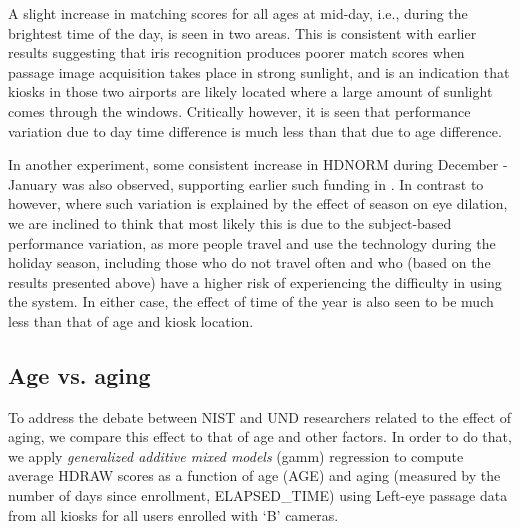 \documentclass{cta-author}%
\begin{document}
A  slight  increase in matching scores for all ages at mid-day, i.e., during the brightest time of the day, is seen in two areas. 
This is consistent with earlier results suggesting that iris recognition produces poorer match scores when passage image acquisition takes place in strong sunlight, 
and is an indication that kiosks in those two airports are likely located where a large amount of sunlight comes through the windows.
Critically however, it is seen that  performance variation due to day time difference is much less than that due to age difference.

In another experiment, some consistent increase in HDNORM during December - January was also observed,  supporting  earlier such funding in \cite{Bowyer-BTAS2016}. 
In contrast to \cite{Bowyer-BTAS2016} however, where such variation is explained by the effect of season on eye dilation, 
we are inclined to think that   most likely this is due to the subject-based performance variation, 
as more people travel and use the technology during the holiday season, including those who do not travel often and who (based on the results presented above) have a higher risk of experiencing the difficulty in using the system.  
In either case, the effect of  time of the year is also seen to be much less than that of age  and kiosk location.

\subsection{Age vs. aging}

To address the debate between NIST and UND researchers related to the effect of aging, 
we compare this effect to that of age and other factors.
In order to do that, we apply 
{\it generalized additive mixed models} (gamm) regression \cite{R-gam}
to compute average HDRAW scores as a function of age (AGE) and aging (measured by the number of days since enrollment, ELAPSED\_TIME)
using  Left-eye passage data from all kiosks for all users enrolled with `B' cameras.
\end{document}
